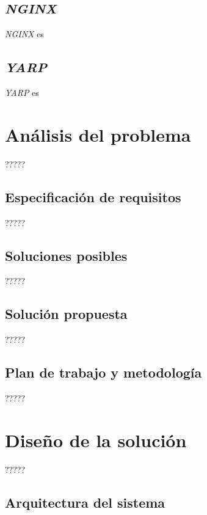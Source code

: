 \documentclass[11pt,spanish,listoffigures]{tfgetsinf}
\begin{document}
\section{\emph{NGINX}}
\emph{NGINX} \cite{NGINX} es

\section{\emph{YARP}}
\emph{YARP} \cite{YARP} es


\chapter{Análisis del problema}

?????

\section{Especificación de requisitos}

?????

\section{Soluciones posibles}

?????

\section{Solución propuesta}

?????

\section{Plan de trabajo y metodología}

?????


\chapter{Diseño de la solución}

?????

\section{Arquitectura del sistema}
\end{document}

